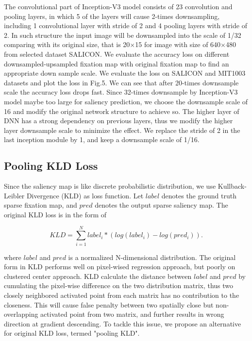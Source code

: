 \documentclass[letterpaper, 10 pt, conference]{ieeeconf}  %
\begin{document}
\par The convolutional part of Inception-V3 model consists of 23 convolution and pooling layers, in which 5 of the layers will cause 2-times downsampling, including 1 convolutional layer with stride of 2 and 4 pooling layers with stride of 2. In such structure the input image will be downsampled into the scale of 1/32 comparing with its original size, that is 20$\times$15 for image with size of 640$\times$480 from selected dataset SALICON. We evaluate the accuracy loss on different downsampled-upsampled fixation map with original fixation map to find an appropriate down sample scale. We evaluate the loss on SALICON and MIT1003 datasets and plot the loss in Fig.5. We can see that after 20-times downsample scale the accuracy loss drops fast. Since 32-times downsample by Inception-V3 model maybe too large for saliency prediction, we choose the downsample scale of 16 and modify the original network structure to achieve so. The higher layer of DNN has a strong dependency on previous layers, thus we modify the higher layer downsample scale to minimize the effect. We replace the stride of 2 in the last inception module by 1, and keep a downsample scale of 1/16.

\subsection{Pooling KLD Loss}

\par Since the saliency map is like discrete probabilistic distribution, we use Kullback-Leibler Divergence (KLD) as loss function. Let $label$ denotes the ground truth sparse fixation map, and $pred$ denotes the output sparse saliency map. The original KLD loss is in the form of

\begin{equation}KLD=\sum_{i=1}^{N}label_{i}*(log(label_{i})-log(pred_{i})).\label{eq}\end{equation}

where $label$ and $pred$ is a normalized N-dimensional distribution. The original form in KLD performs well on pixel-wised regression approach, but poorly on clustered center approach. KLD calculate the distance between $label$ and $pred$ by cumulating the pixel-wise difference on the two distribution matrix, thus two closely neighbored activated point from each matrix has no contribution to the closeness. This will cause false penalty between two spatially close but non-overlapping activated point from two matrix, and further results in wrong direction at gradient descending. To tackle this issue, we propose an alternative for original KLD loss, termed "pooling KLD".
\end{document}
